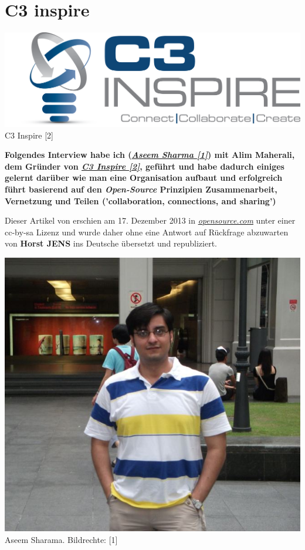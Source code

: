 \section*{C3 inspire}
\hypertarget{c3inspire}{}
\label{c3inspire}
\begin{center}
\includegraphics[width=0.8\linewidth]{c3inspire/c3inspire.png}\\
\footnotesize{C3 Inspire [2]}
\end{center}

\textbf{Folgendes Interview habe ich (\href{http://aseemsharma.info/about-me/aseemsharma/}{\textit{Aseem Sharma [1]}}) mit Alim Maherali, dem Gründer von \href{http://c3inspire.com}{\textit{C3 Inspire [2]}}, geführt und habe dadurch einiges gelernt darüber wie man eine Organisation aufbaut und erfolgreich führt basierend auf den \textit{Open-Source} Prinzipien Zusammenarbeit, Vernetzung und Teilen ('collaboration, connections, and sharing')}

Dieser Artikel von  erschien am 17. Dezember 2013 in \href{http://opensource.com/education/13/12/interview-Alim-Maherali-C3-Inspire}{\textit{opensource.com}} unter einer cc-by-sa Lizenz und wurde daher ohne eine Antwort auf Rückfrage abzuwarten von  \textbf{Horst JENS} ins Deutsche übersetzt und republiziert.\\

\begin{center}
\includegraphics[width=0.7\linewidth]{c3inspire/c3inspire_aseemsharma.jpg} \\
\footnotesize{Aseem Sharama. Bildrechte: [1]}
\end{center}

